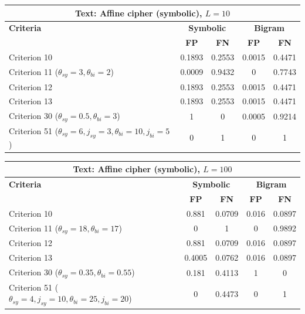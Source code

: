 \begin{center}
\renewcommand{\arraystretch}{1.2}
\setlength{\tabcolsep}{6pt}
\begin{tabular}{|l||c|c||c|c|}
\hline
\multicolumn{5}{|c|}{\textbf{Text: Affine cipher (symbolic), $L=10$}} \\
\hline
\textbf{Criteria} & \multicolumn{2}{c||}{\textbf{Symbolic}} & \multicolumn{2}{c|}{\textbf{Bigram}} \\
\hline
 & \textbf{FP} & \textbf{FN} & \textbf{FP} & \textbf{FN} \\
\hline
Criterion 10 & 0.1893 & 0.2553 & 0.0015 & 0.4471 \\
Criterion 11 ($\theta_{sy}=3, \theta_{bi}=2$) & 0.0009 & 0.9432 & 0 & 0.7743 \\
Criterion 12 & 0.1893 & 0.2553 & 0.0015 & 0.4471 \\
Criterion 13 & 0.1893 & 0.2553 & 0.0015 & 0.4471 \\
Criterion 30 ($\theta_{sy}=0.5, \theta_{bi}=3$) & 1 & 0 & 0.0005 & 0.9214 \\
Criterion 51 ($\theta_{sy}=6, j_{sy}=3, \theta_{bi}=10, j_{bi}=5$) & 0 & 1 & 0 & 1 \\
\hline
\end{tabular}
\end{center}

\begin{center}
\renewcommand{\arraystretch}{1.2}
\setlength{\tabcolsep}{6pt}
\begin{tabular}{|l||c|c||c|c|}
\hline
\multicolumn{5}{|c|}{\textbf{Text: Affine cipher (symbolic), $L=100$}} \\
\hline
\textbf{Criteria} & \multicolumn{2}{c||}{\textbf{Symbolic}} & \multicolumn{2}{c|}{\textbf{Bigram}} \\
\hline
 & \textbf{FP} & \textbf{FN} & \textbf{FP} & \textbf{FN} \\
\hline
Criterion 10 & 0.881 & 0.0709 & 0.016 & 0.0897 \\
Criterion 11 ($\theta_{sy}=18, \theta_{bi}=17$) & 0 & 1 & 0 & 0.9892 \\
Criterion 12 & 0.881 & 0.0709 & 0.016 & 0.0897 \\
Criterion 13 & 0.4005 & 0.0762 & 0.016 & 0.0897 \\
Criterion 30 ($\theta_{sy}=0.35, \theta_{bi}=0.55$) & 0.181 & 0.4113 & 1 & 0 \\
Criterion 51 ($\theta_{sy}=4, j_{sy}=10, \theta_{bi}=25, j_{bi}=20$) & 0 & 0.4473 & 0 & 1 \\
\hline
\end{tabular}
\end{center}

